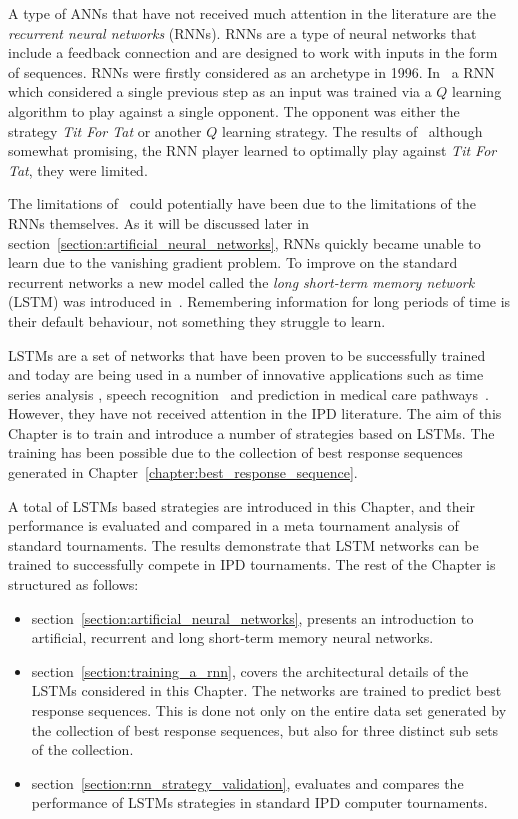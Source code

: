 A type of ANNs that have not received much attention in the literature are the
\textit{recurrent neural networks} (RNNs). RNNs are a type of neural networks
that include a feedback connection and are designed to work with inputs in
the form of sequences. RNNs were firstly considered as an archetype in 1996.
In~\cite{Sandholm1996} a RNN which considered a single previous step
as an input was trained via a \(Q\) learning algorithm to play against a single
opponent. The opponent was either the strategy \textsl{Tit For Tat} or another \(Q\)
learning strategy. The results of~\cite{Sandholm1996} although somewhat
promising, the RNN player learned to optimally play against \textsl{Tit For Tat},
they were limited.

The limitations of~\cite{Sandholm1996} could potentially have been due to the
limitations of the RNNs themselves. As it will be discussed later in
section~\ref{section:artificial_neural_networks}, RNNs
quickly became unable to learn due to the vanishing gradient problem.
To improve on the standard recurrent networks a new model called the
\textit{long short-term memory network} (LSTM) was introduced in~\cite{Hochreiter1997}.
Remembering information for long periods of time is 
their default behaviour, not something they struggle to learn.

LSTMs are a set of networks that have been proven to be successfully trained and
today are being used in a number of innovative applications such as time series
analysis \cite{Malhotra2015}, speech recognition~\cite{Sak2014} and prediction
in medical care pathways~\cite{Wang2018_lstm}. However, they have not received
attention in the IPD literature. The aim of this Chapter is to train and
introduce a number of strategies based on LSTMs. The training has been possible
due to the collection of best response sequences generated in
Chapter~\ref{chapter:best_response_sequence}.

A total of \lstmstrategies LSTMs based strategies are introduced in this
Chapter, and their performance is evaluated and compared in a meta tournament
analysis of \metatournamentslstm standard tournaments. The results demonstrate
that LSTM networks can be trained to successfully compete in IPD tournaments.
The rest of the Chapter is structured as follows:

\begin{itemize}
    \item section~\ref{section:artificial_neural_networks}, presents an
    introduction to artificial, recurrent and long short-term memory neural networks.
    \item section~\ref{section:training_a_rnn}, covers the architectural details
    of the LSTMs considered in this Chapter. The networks are trained to predict
    best response sequences. This is done not only on the entire data set
    generated by the collection of best response sequences, but also for three
    distinct sub sets of the collection.
    \item section~\ref{section:rnn_strategy_validation}, evaluates and compares
    the performance of \lstmstrategies LSTMs strategies in
    \metatournamentslstm standard IPD computer tournaments.
\end{itemize}

